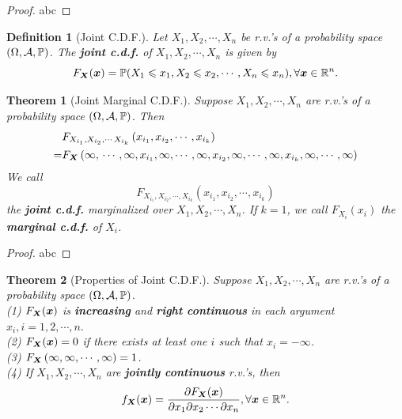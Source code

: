 \documentclass[openany,12pt]{book}
\newtheorem{theorem}{Theorem}[chapter]
\newtheorem{definition}{Definition}[chapter]
\begin{document}
\begin{proof}
  abc
\end{proof}

\begin{definition}[Joint C.D.F.]
  Let $X_{1}, X_{2}, \cdots,X_{n}$ be r.v.'s of a probability space $(\Omega,\mathcal{A},\mathbb{P})$. The \textbf{joint c.d.f.} of $X_{1}, X_{2}, \cdots,X_{n}$ is given by
  \[F_{\bm{X}}(\bm{x})= \mathbb{P}( X_{1} \leqslant x_{1},X_{2} \leqslant x_{2}, \cdots,X_{n} \leqslant x_{n}), \forall\bm{x} \in \mathbb{R}^{n}.\]
\end{definition}

\begin{theorem}[Joint Marginal C.D.F.]
  Suppose $X_{1}, X_{2}, \cdots,X_{n}$ are r.v.'s of a probability space $(\Omega,\mathcal{A},\mathbb{P})$. Then
  \[\begin{aligned}
        & F_{X_{i_{1}},X_{i_{2}},\cdots\,X_{i_{k}}}\left( x_{i_{1}},x_{i_{2}}, \cdots,x_{i_{k}} \right)                                                 \\
      = & F_{\bm{X}}\left( \infty,\, \cdots,\infty,x_{i_{1}},\infty, \cdots,\infty,x_{i_{2}},\infty, \cdots,\infty,x_{i_{k}},\infty, \cdots,\infty \right)
    \end{aligned}\]
  We call \[F_{X_{i_{1}},X_{i_{2}}, \cdots,X_{i_{k}}}\left( x_{i_{1}},x_{i_{2}}, \cdots,x_{i_{k}} \right)\] the \textbf{joint c.d.f.} marginalized over $X_{1}, X_{2}, \cdots,X_{n}$. If $k = 1$, we call $F_{X_{i}}(x_{i})$ the \textbf{marginal c.d.f.} of $X_{i}$.
\end{theorem}

\begin{proof}
  abc
\end{proof}

\begin{theorem}[Properties of Joint C.D.F.]
  Suppose $X_{1}, X_{2}, \cdots,X_{n}$ are r.v.'s of a probability
  space $(\Omega,\mathcal{A},\mathbb{P})$.\\
  (1) $F_{\bm{X}}(\bm{x})$ is \textbf{increasing} and \textbf{right
    continuous} in each argument $x_{i},i = 1,2, \cdots,n.$\\
  (2) $F_{\bm{X}}(\bm{x})= 0$ if there exists at least one $i$ such
  that $x_{i} = - \infty$.\\
  (3) $F_{\bm{X}}\left( \infty,\infty, \cdots,\infty \right)= 1$.\\
  (4) If $X_{1}, X_{2}, \cdots,X_{n}$ are \textbf{jointly continuous}
  r.v.'s, then
  \[f_{\bm{X}}(\bm{x})= \frac{\partial F_{\bm{X}}(\bm{x})}{\partial x_{1}\partial x_{2}\cdots\partial x_{n}}, \forall\bm{x} \in \mathbb{R}^{n}.\]
\end{theorem}
\end{document}
